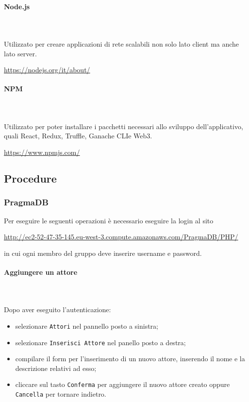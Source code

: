 		\paragraph{Node.js} \mbox{}\\ \mbox{}\\
		Utilizzato per creare applicazioni di rete scalabili non solo lato client ma anche lato server.\\
		\centerline{\url{https://nodejs.org/it/about/}}
		
		\paragraph{NPM} \mbox{}\\ \mbox{}\\
		Utilizzato per poter installare i pacchetti necessari allo sviluppo dell'applicativo, quali React\glo, Redux\glo, Truffle\glo, Ganache CLI\glosp e Web3\glo. \\
		\centerline{\url{https://www.npmjs.com/}}
		
	\subsection{Procedure}	
	\subsubsection{PragmaDB} 
	Per eseguire le seguenti operazioni è necessario eseguire la login al sito \\
	\centerline{\url{http://ec2-52-47-35-145.eu-west-3.compute.amazonaws.com/PragmaDB/PHP/}}
	in cui ogni membro del gruppo deve inserire username e password.
	
	\paragraph{Aggiungere un attore} \mbox{}\\ \mbox{}\\
	Dopo aver eseguito l'autenticazione:
	\begin{itemize}
		\item selezionare \texttt{Attori} nel pannello posto a sinistra;
		\item selezionare \texttt{Inserisci Attore} nel panello posto a destra;
		\item compilare il form per l'inserimento di un nuovo attore, inserendo 
		il nome e la descrizione relativi ad esso;
		\item cliccare sul tasto \texttt{Conferma} per aggiungere il nuovo attore 
		creato oppure \texttt{Cancella} per tornare indietro.	
	\end{itemize}
	
